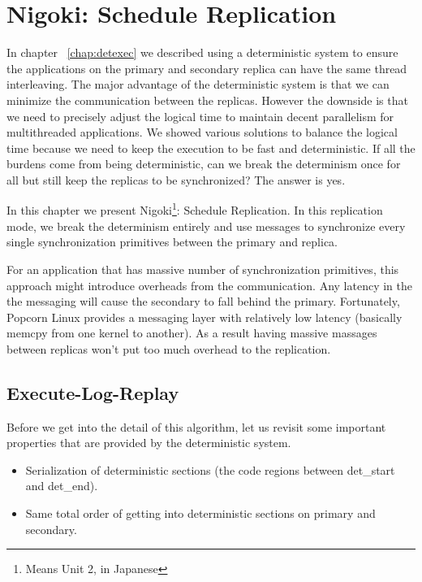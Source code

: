 \chapter{Nigoki: Schedule Replication} \label{chap:schedrep}
In chapter ~\ref{chap:detexec} we described using a deterministic system to ensure the applications on the primary and secondary replica can have the same thread interleaving. The major advantage of the deterministic system is that we can minimize the communication between the replicas. However the downside is that we need to precisely adjust the logical time to maintain decent parallelism for multithreaded applications. We showed various solutions to balance the logical time because we need to keep the execution to be fast and deterministic. If all the burdens come from being deterministic, can we break the determinism once for all but still keep the replicas to be synchronized? The answer is yes.

In this chapter we present Nigoki\footnote{Means Unit 2, in Japanese}: Schedule Replication. In this replication mode, we break the determinism entirely and use messages to synchronize every single synchronization primitives between the primary and replica.

For an application that has massive number of synchronization primitives, this approach might introduce overheads from the communication. Any latency in the the messaging will cause the secondary to fall behind the primary. Fortunately, Popcorn Linux provides a messaging layer with relatively low latency (basically memcpy from one kernel to another). As a result having massive massages between replicas won't put too much overhead to the replication.


\section{Execute-Log-Replay}
Before we get into the detail of this algorithm, let us revisit some important properties that are provided by the deterministic system.

\begin{itemize}
\item Serialization of deterministic sections (the code regions between det\_start and det\_end). 
\item Same total order of getting into deterministic sections on primary and secondary.
\end{itemize}

